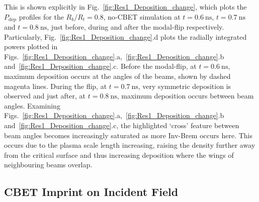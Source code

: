 This is shown explicitly in Fig.~\ref{fig:Res1_Deposition_change}, which plots the $P_\text{dep}$ profiles for the $R_b/R_t=0.8$, no-\ac{CBET} simulation at $t=0.6\ \text{ns}$, $t=0.7\ \text{ns}$ and $t=0.8\ \text{ns}$,  just before, during and after the modal-flip respectively.
Particularly, Fig.~\ref{fig:Res1_Deposition_change}.d plots the radially integrated powers plotted in Figs.~\ref{fig:Res1_Deposition_change}.a,~\ref{fig:Res1_Deposition_change}.b and~\ref{fig:Res1_Deposition_change}.c.
Before the modal-flip, at $t=0.6\ \text{ns}$, maximum deposition occurs at the angles of the beams, shown by dashed magenta lines.
During the flip, at $t=0.7\ \text{ns}$, very symmetric deposition is observed and just after, at $t=0.8\ \text{ns}$, maximum deposition occurs between beam angles.
Examining Figs.~\ref{fig:Res1_Deposition_change}.a,~\ref{fig:Res1_Deposition_change}.b and~\ref{fig:Res1_Deposition_change}.c, the highlighted `cross' feature between beam angles becomes increasingly saturated as more \ac{Inv-Brem} occurs here.
This occurs due to the plasma scale length increasing, raising the density further away from the critical surface and thus increasing deposition where the wings of neighbouring beams overlap.

\subsection{CBET Imprint on Incident Field}%
\label{sec:Res1_CBET_imprint}

